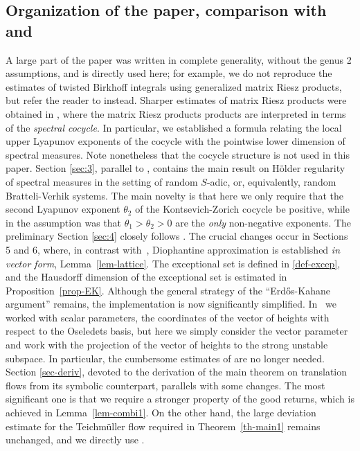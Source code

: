 \documentclass[JEP,XML,SOM,Unicode]{cedram}
\theoremstyle{plain}
\theoremstyle{definition}
\begin{document}
\subsection{Organization of the paper, comparison with \cite{BuSo18a} and \cite{BuSo19}} A large part of the paper \cite{BuSo18a} was written in complete generality, without the genus 2 assumptions, and is directly used here; for
example, we do not reproduce the estimates of twisted Birkhoff integrals using generalized matrix Riesz products, but refer the reader to \cite[\S3]{BuSo18a} instead.
Sharper estimates of matrix Riesz products were obtained in \cite{BuSo19}, where the matrix Riesz products products are interpreted in terms of the \emph{spectral cocycle}. In particular, we established a formula relating the local upper Lyapunov exponents of the cocycle with the pointwise lower dimension of spectral measures. Note nonetheless that the cocycle structure is not used in this paper.
Section \ref{sec:3}, parallel to \cite[\S4]{BuSo18a}, contains the main result on Hölder regularity of spectral measures in the setting of random $S$-adic, or, equivalently, random Bratteli-Verhik systems.
The main novelty is that here we only require that the second Lyapunov exponent $\theta_2$ of the
Kontsevich-Zorich cocycle be positive, while in \cite{BuSo18a} the assumption was that $\theta_1 > \theta_2 >0$ are the \emph{only} non-negative exponents.
The preliminary Section \ref{sec:4} closely follows \cite{BuSo18a}.
The crucial changes occur in Sections 5 and 6, where, in contrast with~\cite{BuSo18a}, Diophantine approximation is established {\it in vector form}, \cf Lemma~\ref{lem-lattice}. The exceptional set is defined in \eqref{def-excep}, and the Hausdorff dimension of the exceptional set is estimated in Proposition~\ref{prop-EK}. Although the general strategy of the ``Erd\H{o}s-Kahane argu\-ment'' remains, the implementation is now significantly simplified. In~\cite{BuSo18a} we worked with scalar parameters, the coordinates of the vector of heights with respect to the \hbox{Oseledets} \hbox{basis}, but here we simply consider the vector parameter and work with the projection of the vector of heights to the strong unstable subspace.
In particular, the cumbersome estimates of \cite[\S8]{BuSo18a} are no longer needed.
Section \ref{sec-deriv}, devoted to the derivation of the main theorem on translation flows from its symbolic counterpart, parallels \cite[\S11]{BuSo18a} with some changes. The most significant one is that we require a stronger property of the good returns, which is achieved in Lemma~\ref{lem-combi1}. On the other hand, the large deviation estimate for the Teichmüller flow required in Theorem~\ref{th-main1} remains unchanged, and we directly use \cite[Prop.\,11.3]{BuSo18a}.\enlargethispage{.5\baselineskip}%
\end{document}
